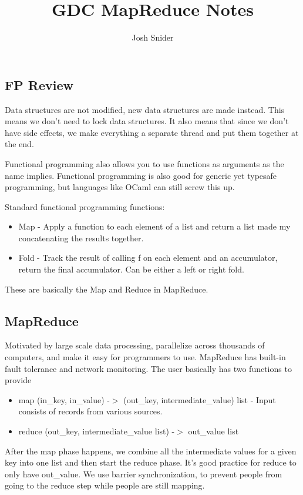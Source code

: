 \documentclass{scrartcl}
\title{GDC MapReduce Notes}
\author{Josh Snider}
\begin{document}
\maketitle
\subsection*{FP Review}
Data structures are not modified, new data structures are made instead.
This means we don't need to lock data structures. It also means that since
we don't have side effects, we make everything a separate thread and
put them together at the end.

Functional programming also allows you to use functions as arguments as the 
name implies. Functional programming is also good for generic yet typesafe
programming, but languages like OCaml can still screw this up.

Standard functional programming functions:
\begin{itemize}
\item Map - Apply a function to each element of a list and return a list made my
	concatenating the results together.
\item Fold - Track the result of calling f on each element and an accumulator,
	return the final accumulator. Can be either a left or right fold.
\end{itemize}
These are basically the Map and Reduce in MapReduce.
\subsection*{MapReduce}
Motivated by large scale data processing, parallelize across thousands of
computers, and make it easy for programmers to use. MapReduce has built-in
fault tolerance and network monitoring. The user basically has two functions
to provide
\begin{itemize}
\item map (in\_key, in\_value) -$>$ (out\_key, intermediate\_value) list -
	Input consists of records from various sources.
\item reduce (out\_key, intermediate\_value list) -$>$ out\_value list
\end{itemize}
After the map phase happens, we combine all the intermediate values for
a given key into one list and then start the reduce phase. It's good practice
for reduce to only have out\_value. We use barrier synchronization, to prevent
people from going to the reduce step while people are still mapping.
\end{document}
